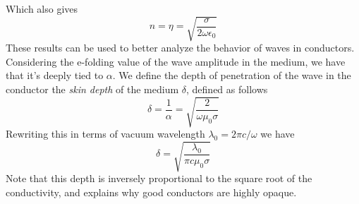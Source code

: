 \documentclass[../electromagnetism.tex]{subfiles}
\begin{document}
Which also gives
\begin{equation}
	n=\eta=\sqrt{\frac{\sigma}{2\omega\epsilon_0}}
	\label{eq:nlf.csol}
\end{equation}
These results can be used to better analyze the behavior of waves in conductors. Considering the e-folding value of the wave amplitude in the medium, we have that it's deeply tied to $\alpha$. We define the depth of penetration of the wave in the conductor the \textit{skin depth} of the medium $\delta$, defined as follows
\begin{equation}
	\delta=\frac{1}{\alpha}=\sqrt{\frac{2}{\omega\mu_0\sigma}}
	\label{eq:skindepthf.csol}
\end{equation}
Rewriting this in terms of vacuum wavelength $\lambda_0=2\pi c/\omega$ we have
\begin{equation}
	\delta=\sqrt{\frac{\lambda_0}{\pi c\mu_0\sigma}}
	\label{eq:skindepth.csol}
\end{equation}
Note that this depth is inversely proportional to the square root of the conductivity, and explains why good conductors are highly opaque.
\end{document}
